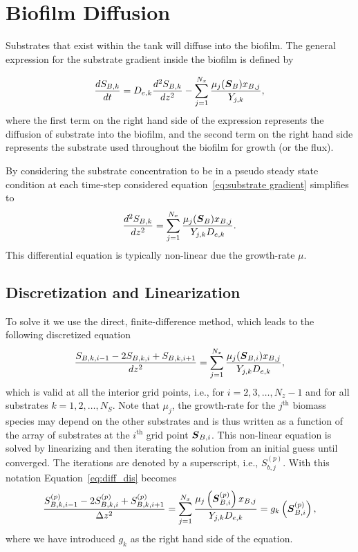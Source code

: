 \documentclass[letterpaper, twoside]{article}
\numberwithin{equation}{section}
\newcommand{\ie}{i.e.}
\def\bm#1{\mbox{\boldmath{$#1$}}}
\begin{document}
\section{Biofilm Diffusion}
Substrates that exist within the tank will diffuse into the biofilm. The general expression for the substrate gradient inside the biofilm is defined by

\begin{equation} \label{eq:substrate gradient}
\frac{dS_{B,k}}{dt} = D_{e,k} \frac{d^2S_{B,k}}{dz^2} - \sum_{j=1}^{N_x}\frac{\mu_j(\bm{S}_B) x_{B,j}}{Y_{j,k}},
\end{equation}
where the first term on the right hand side of the expression represents the diffusion of substrate into the biofilm, and the second term on the right hand side represents the substrate used throughout the biofilm for growth (or the flux).

By considering the substrate concentration to be in a pseudo steady state condition at each time-step considered equation~\ref {eq:substrate gradient} simplifies to 
\begin{equation} \label{eq:diffusion}
  \frac{d^2 S_{B,k}}{dz^2} = \sum_{j=1}^{N_x}\frac{\mu_j(\bm{S}_B) x_{B,j}}{Y_{j,k} D_{e,k}}.
\end{equation}
This differential equation is typically non-linear due the growth-rate $\mu$.

\subsection{Discretization and Linearization}
To solve it we use the direct, finite-difference method, which leads to the following discretized equation
\begin{equation} \label{eq:diff_dis}
  \frac{ S_{B,k,i-1} - 2 S_{B,k,i} + S_{B,k,i+1}}{dz^2} = \sum_{j=1}^{N_x}\frac{\mu_j(\bm{S}_{B,i}) x_{B,j}}{Y_{j,k} D_{e,k}},
\end{equation}
which is valid at all the interior grid points, \ie, for $i=2,3,\dots,N_z-1$ and for all substrates $k=1,2,\dots,N_S$.
Note that $\mu_j$, the growth-rate for the $j^\mathrm{th}$ biomass species may depend on the other substrates and is thus written as a function of the array of substrates at the $i^\mathrm{th}$ grid point $\bm{S}_{B,i}$.
This non-linear equation is solved by linearizing and then iterating the solution from an initial guess until converged.
The iterations are denoted by a superscript, \ie, $S_{b,j}^{(p)}$.  With this notation Equation~\ref{eq:diff_dis} becomes
\begin{equation} \label{eq:diff_dis_iter}
  \frac{ S_{B,k,i-1}^{(p)} - 2 S_{B,k,i}^{(p)} + S_{B,k,i+1}^{(p)}}{\Delta z^2} = \sum_{j=1}^{N_x} \frac{\mu_j\left(\bm{S}_{B,i}^{(p)}\right) x_{B,j}}{Y_{j,k} D_{e,k}} =  g_k\left(\bm{S}_{B,i}^{(p)}\right),
\end{equation}
where we have introduced $g_k$ as the right hand side of the equation.
\end{document}
